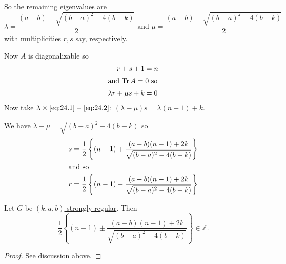 \documentclass{article}
\DeclareMathOperator{\Tr}{Tr}
\begin{document}
So the remaining eigenvalues are
\begin{equation*}
    \lambda = \frac{(a-b) + \sqrt{(b-a)^2 - 4(b-k)}}{2} \text{ and } \mu = \frac{(a-b) - \sqrt{(b-a)^2 - 4(b-k)}}{2}
\end{equation*}
with multiplicities $r,s$ say, respectively.

Now $A$ is diagonalizable so
\begin{align}
    r + s + 1 &= n \label{eq:24.1} \\
    \shortintertext{and $\Tr A = 0$ so}
    \lambda r + \mu s + k &= 0 \label{eq:24.2}
\end{align}
Now take $\lambda \times \eqref{eq:24.1} - \eqref{eq:24.2}$: $(\lambda - \mu) s = \lambda(n-1) + k$.

We have $\lambda-\mu = \sqrt{(b-a)^2 - 4(b-k)}$ so
\begin{align*}
    s &= \frac{1}{2} \left\{ (n-1) + \frac{(a-b)(n-1) + 2k}{\sqrt{(b-a)^2 - 4(b-k)}}\right\} \\
    \shortintertext{and so}
    r &= \frac{1}{2} \left\{ (n-1) - \frac{(a-b)(n-1) + 2k}{\sqrt{(b-a)^2 - 4(b-k)}}\right\}
\end{align*}
\begin{nthm}\label{thm:47}
    Let $G$ be \hyperlink{def:sr}{$(k,a,b)$-strongly regular}.
    Then
    \begin{equation*}
        \frac{1}{2} \left\{ (n-1) \pm \frac{(a-b)(n-1) + 2k}{\sqrt{(b-a)^2 - 4(b-k)}}\right\} \in \mathbb{Z}.
    \end{equation*}
\end{nthm}
\begin{proof}
    See discussion above.
\end{proof}
\end{document}
